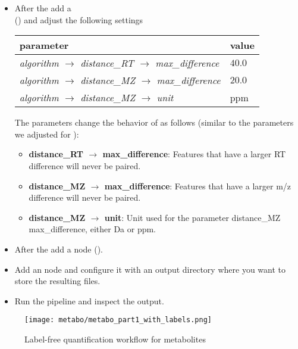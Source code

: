 \begin{itemize}
\item
After the  add a  \\
 () and adjust the following settings

\begin{center}
\begin{tabular}{l|l}
\textbf{parameter} & \textbf{value} \\ \hline
\textit{algorithm $\rightarrow$ distance\_RT $\rightarrow$ max\_difference} & $40.0$ \\
\textit{algorithm $\rightarrow$ distance\_MZ $\rightarrow$ max\_difference} & $20.0$ \\
\textit{algorithm $\rightarrow$ distance\_MZ $\rightarrow$ unit} & ppm
\end{tabular}
\end{center}

\noindent The parameters change the behavior of  as follows (similar to the parameters we adjusted for ):
\begin{itemize}
\item \textbf{distance\_RT $\rightarrow$ max\_difference}: Features that have a larger RT difference will never be paired.
\item \textbf{distance\_MZ $\rightarrow$ max\_difference}: Features that have a larger m/z difference will never be paired.
\item \textbf{distance\_MZ $\rightarrow$ unit}: Unit used for the parameter distance\_MZ max\_difference, either Da or ppm.
\end{itemize}

\item
After the  add a  node ().
\item
Add an  node and configure it with an output directory where you want to store the resulting files.
\item
Run the pipeline and inspect the output.
\end{itemize}

\begin{figure}[htbp]
  \centering
  \texttt{[image: metabo/metabo\_part1\_with\_labels.png]}
  \caption{Label-free quantification workflow for metabolites}
  \label{fig:metabo_part1}
\end{figure}

